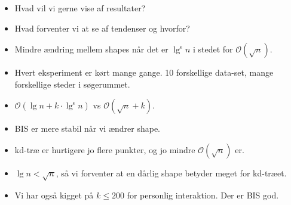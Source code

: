 \documentclass[pdf]{beamer}
\begin{document}
\begin{frame}
      \begin{itemize}
        \item Hvad vil vi gerne vise af resultater?
        \item Hvad forventer vi at se af tendenser og hvorfor?
        \item Mindre ændring mellem shapes når det er $\lg^\epsilon n$ i stedet for $\mathcal{O}(\sqrt{n})$.
        \item Hvert eksperiment er kørt mange gange. 10 forskellige data-set, mange forskellige steder i søgerummet.
      \end{itemize}
      \begin{itemize}
        \item $\mathcal{O}(\lg n + k\cdot\lg^\epsilon n)$ vs $\mathcal{O}(\sqrt{n} + k)$.
        \item BIS er mere stabil når vi ændrer shape.
        \item kd-træ er hurtigere jo flere punkter, og jo mindre $\mathcal{O}(\sqrt{n})$ er.
        \item $\lg n < \sqrt{n}$, så vi forventer at en dårlig shape betyder meget for kd-træet.
        \item Vi har også kigget på $k \leq 200$ for personlig interaktion. Der er BIS god.
      \end{itemize}
\end{frame}
\end{document}

